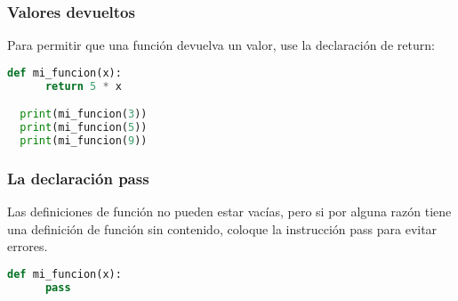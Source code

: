 \begin{frame}[fragile]
  \frametitle{Valores devueltos}

  Para permitir que una función devuelva un valor,
  use la declaración de \textcolor{codeKeyword}{return}:

  \vspace{\baselineskip}
  \begin{lstlisting}[language=Python]
  def mi_funcion(x):
      return 5 * x

  print(mi_funcion(3))
  print(mi_funcion(5))
  print(mi_funcion(9))
  \end{lstlisting}
\end{frame}

\begin{frame}[fragile]
  \frametitle{La declaración \textbf{pass}}

  Las definiciones de función no pueden estar vacías, pero si
  por alguna razón tiene una definición de función sin contenido,
  coloque la instrucción \textcolor{codeKeyword}{pass} para
  evitar errores. 

  \vspace{\baselineskip}
  \begin{lstlisting}[language=Python]
  def mi_funcion(x):
      pass
  \end{lstlisting}
\end{frame}
